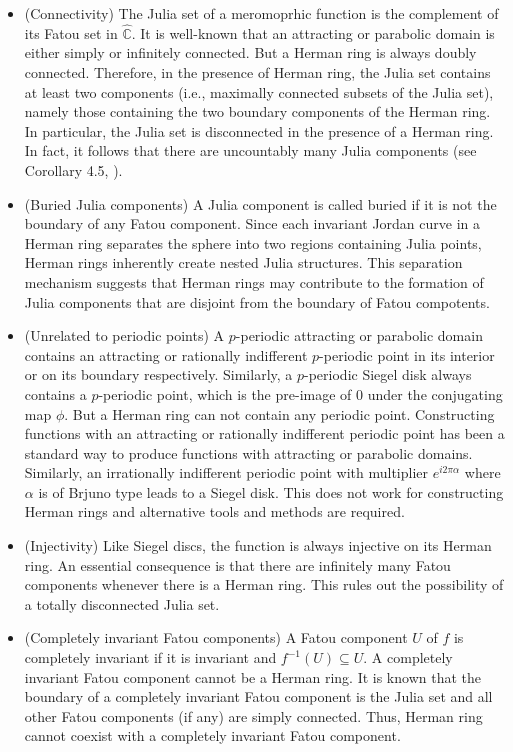 \documentclass[12pt]{article}
\begin{document}
\begin{itemize}
	\item (Connectivity) The Julia set of a meromoprhic function is the complement of its Fatou set in $\widehat{\mathbb{C}}$.  It is well-known that an attracting or parabolic domain is either simply or infinitely connected. But a Herman ring 
is always doubly connected. Therefore, in the presence of Herman ring, the Julia set contains at least two components (i.e., maximally connected subsets of the Julia set), namely those containing the two boundary components of the Herman ring. In particular, the Julia set is disconnected in the presence of a Herman ring. In fact, it follows that there are uncountably many Julia components (see Corollary 4.5, \cite{jm}). 
\item (Buried Julia components) A Julia component is called buried if it is not the boundary of any Fatou component. Since each invariant Jordan curve in a Herman ring separates the sphere into two regions containing Julia points, Herman rings inherently create nested Julia structures. This separation mechanism suggests that Herman rings may contribute to the formation of Julia components that are disjoint from the boundary of Fatou compotents. 

\item (Unrelated to periodic points) A $p$-periodic attracting or parabolic domain contains an attracting or rationally indifferent $p$-periodic point in its interior or on its boundary respectively. Similarly, a $p$-periodic Siegel disk always contains a $p$-periodic point, which is the pre-image of $0$ under the conjugating map $\phi$. But a Herman ring can not contain any periodic point.  Constructing functions with an attracting or rationally indifferent  periodic point  has been a standard way to produce functions with attracting or parabolic domains. Similarly, an irrationally indifferent periodic point   with multiplier $e^{i 2 \pi \alpha}$  where $\alpha$ is of Brjuno type  leads to a Siegel disk. This does not work for constructing Herman rings  and  alternative tools and methods are required.
	\item (Injectivity) Like Siegel discs, the function is always injective  on its Herman ring. An essential consequence is that there are infinitely many Fatou components whenever there is a Herman ring. This rules out the possibility of a totally disconnected Julia set.
	\item (Completely invariant Fatou components) A Fatou component $U$ of $f$ is completely invariant if it is invariant  and $f^{-1}(U) \subseteq U $. A completely invariant Fatou component cannot be a Herman ring. It is known that the boundary of a completely invariant Fatou component is the Julia set and all other Fatou components (if any) are simply connected. Thus, Herman ring cannot coexist with a completely invariant Fatou component.
\end{itemize}
\end{document}

